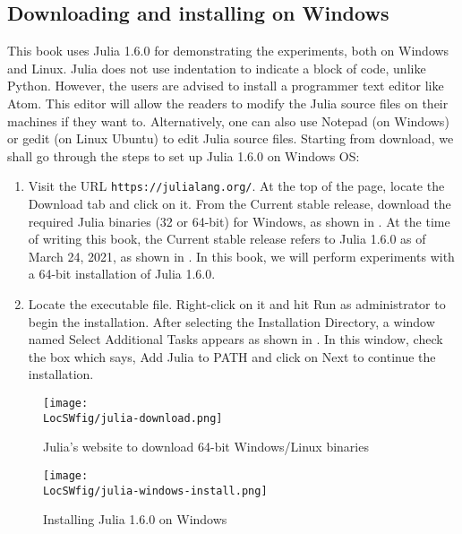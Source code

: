 \subsection{Downloading and installing on Windows} \label{julia-install-windows}
This book uses Julia 1.6.0 for demonstrating the experiments, both on Windows and Linux. 
Julia does not use indentation to indicate a block of code, unlike Python. However, 
the users are advised to install a programmer text editor like Atom. This editor will 
allow the readers to modify the Julia source files on their machines if they want to. 
Alternatively, one can also use Notepad (on Windows) or gedit (on Linux Ubuntu) to edit 
Julia source files. Starting from download, we shall go through the steps to set 
up Julia 1.6.0 on Windows OS:
\begin{enumerate}
      \item Visit the URL {\tt https://julialang.org/}.  At the top of the page, 
      locate the Download tab and click on it. From the Current stable release, 
      download the required Julia binaries (32 or 64-bit) for Windows, as shown in . 
      At the time of writing this book, the Current stable release refers to Julia 1.6.0 
      as of March 24, 2021, as shown in . In this book, we will perform 
      experiments with a 64-bit installation of Julia 1.6.0.
      \item Locate the executable file. Right-click on it and hit 
      Run as administrator to begin the installation. After selecting the Installation Directory, 
      a window named Select Additional Tasks appears as shown in . 
      In this window, check the box which says, Add Julia to PATH and click on Next to continue the installation. 
\end{enumerate}

\begin{figure}
      \centering
      \texttt{[image: \\LocSWfig/julia-download.png]}
      \caption{Julia's website to download 64-bit Windows/Linux binaries}
      \label{julia-download}
\end{figure}

\begin{figure}
      \centering
      \texttt{[image: \\LocSWfig/julia-windows-install.png]}
      \caption{Installing Julia 1.6.0 on Windows}
      \label{julia-windows-install}
\end{figure}

